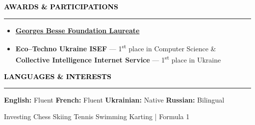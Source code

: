 \documentclass[10pt,english,french]{article}
\newcommand{\chessIcon}[1][black]{\textcolor{#1}{\faChess}}
\newcommand{\skiIcon}[1][black]{\textcolor{#1}{\faSkiing}}
\newcommand{\cryptoIcon}[1][black]{\textcolor{#1}{\faBitcoin}}
\newcommand{\swimmingIcon}[1][black]{\textcolor{#1}{\faSwimmer}}
\newcommand{\mountainsIcon}[1][black]{\textcolor{#1}{\faMountain}}
\newcommand{\awardIcon}[1][black]{\textcolor{#1}{\faTrophy}}
\newcommand{\speechBubbleIcon}[1][black]{\textcolor{#1}{\faComment}}
\newcommand{\tradingIcon}[1][black]{\textcolor{#1}{\faChartBar}}
\newcommand{\tennisIcon}[1][black]{\textcolor{#1}{\faBaseballBall}}
\newcommand{\flagIcon}[1][black]{\textcolor{#1}{\faFlagCheckered}}
\newlength{\mpwidth}
\newcommand{\cvsection}[1]{
    \vspace{4pt}
    \textbf{\fontsize{9pt}{10pt}\selectfont \textcolor{black}{#1}}
    \vspace{6pt}
    \hrule
    \vspace{6pt}
}
\newcommand{\cvtextnotab}[1]{
    \parbox{1\mpwidth}{#1}
}
\begin{document}
\vspace{-3pt}
\cvsection{\awardIcon[black]\hspace{4pt}AWARDS \& PARTICIPATIONS}

\vspace{-6pt}
\begin{itemize}[leftmargin=0.35cm, label=\textbullet, itemsep=0.15em]
    \item \textbf{\href{https://www.fondationbesse.com/}{Georges Besse Foundation Laureate}}
    \item \textbf{Eco\hspace{3pt}--\hspace{3pt}Techno Ukraine ISEF} --- 1\textsuperscript{st} place in Computer Science \& \textbf{Collective Intelligence Internet Service} --- 1\textsuperscript{st} place in Ukraine
\end{itemize}

\vspace{-5pt}
\cvsection{\speechBubbleIcon[black]\hspace{4pt}LANGUAGES \& INTERESTS}

\vspace{-3pt}
\cvtextnotab{\textbf{English\!:} Fluent \hspace{12pt} \textbf{French\!:} Fluent \hspace{12pt} \textbf{Ukrainian\!:} Native \hspace{20pt} \textbf{Russian\!:} Bilingual}

\vspace{-8pt}
\cvtextnotab{
    \tradingIcon[black]\hspace{2pt}Investing \hspace{12pt}
    \chessIcon[black]\hspace{2pt}Chess \hspace{12pt}
    \skiIcon[black]\hspace{2pt}Skiing \hspace{12pt}
    \tennisIcon[black]\hspace{2pt}Tennis \hspace{12pt}
    \swimmingIcon[black]\hspace{2pt}Swimming \hspace{12pt}
    \flagIcon[black]\hspace{2pt}Karting | Formula 1
}
\end{document}
